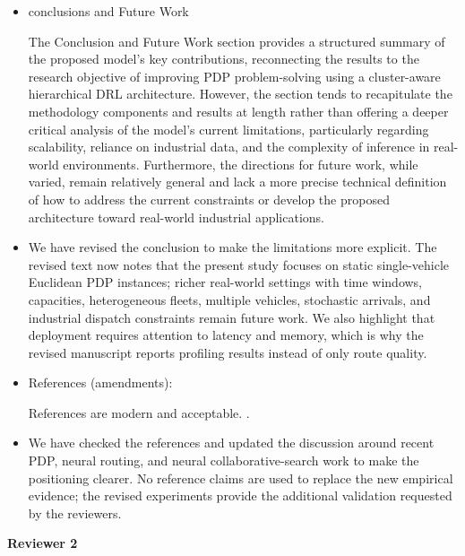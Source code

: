 \documentclass{article}
\begin{document}
\begin{itemize}
\item[\textbf{Comment. 7}] {conclusions and Future Work


The Conclusion and Future Work section provides a structured summary of the proposed model's key contributions, reconnecting the results to the research objective of improving PDP problem-solving using a cluster-aware hierarchical DRL architecture. However, the section tends to recapitulate the methodology components and results at length rather than offering a deeper critical analysis of the model's current limitations, particularly regarding scalability, reliance on industrial data, and the complexity of inference in real-world environments. Furthermore, the directions for future work, while varied, remain relatively general and lack a more precise technical definition of how to address the current constraints or develop the proposed architecture toward real-world industrial applications.}


\item[\textbf{Response:}] We have revised the conclusion to make the limitations more explicit. The revised text now notes that the present study focuses on static single-vehicle Euclidean PDP instances; richer real-world settings with time windows, capacities, heterogeneous fleets, multiple vehicles, stochastic arrivals, and industrial dispatch constraints remain future work. We also highlight that deployment requires attention to latency and memory, which is why the revised manuscript reports profiling results instead of only route quality.


\item[\textbf{Comment. 8}] {References (amendments):


References are modern and acceptable.
. }


\item[\textbf{Response:}] We have checked the references and updated the discussion around recent PDP, neural routing, and neural collaborative-search work to make the positioning clearer. No reference claims are used to replace the new empirical evidence; the revised experiments provide the additional validation requested by the reviewers.


\end{itemize}

\vspace{0.5cm}

\begin{center}
\Large \textbf{Reviewer 2}
\end{center}
\end{document}
